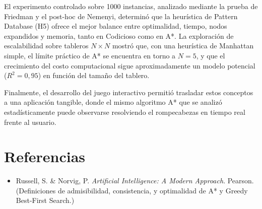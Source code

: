 \documentclass[11pt]{article}
\begin{document}
El experimento controlado sobre 1000 instancias, analizado mediante la
prueba de Friedman y el post-hoc de Nemenyi, determinó que la heurística de
Pattern Database (H5) ofrece el mejor balance entre optimalidad, tiempo,
nodos expandidos y memoria, tanto en Codicioso como en A*. La exploración de
escalabilidad sobre tableros $N\times N$ mostró que, con una heurística de
Manhattan simple, el límite práctico de A* se encuentra en torno a $N=5$, y
que el crecimiento del costo computacional sigue aproximadamente un modelo
potencial ($R^2=0{,}95$) en función del tamaño del tablero.

Finalmente, el desarrollo del juego interactivo permitió trasladar estos
conceptos a una aplicación tangible, donde el mismo algoritmo A* que se
analizó estadísticamente puede observarse resolviendo el rompecabezas en
tiempo real frente al usuario.

\section*{Referencias}
\begin{itemize}
\item[] Russell, S. \& Norvig, P. \textit{Artificial Intelligence: A Modern
Approach}. Pearson. (Definiciones de admisibilidad, consistencia, y
optimalidad de A* y Greedy Best-First Search.)
\end{itemize}
\end{document}
